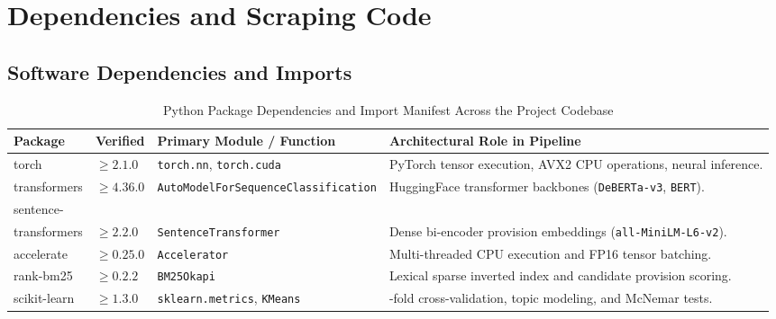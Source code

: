 \chapter{Dependencies and Scraping Code}
\label{app:code_ingestion}

\section{Software Dependencies and Imports}
\label{sec:app_package_manifest}

\begin{table}[htbp]
    \centering
    \scriptsize
    \setlength{\tabcolsep}{3.5pt}
    \renewcommand{\arraystretch}{0.90}
    \caption[Python Package Dependencies and Import Manifest]{Python Package Dependencies and Import Manifest Across the Project Codebase}
    \label{tab:app_package_manifest}
    \begin{tabularx}{\linewidth}{>{\RaggedRight\arraybackslash\ttfamily}p{2.8cm}>{\centering\arraybackslash}p{1.4cm}>{\RaggedRight\arraybackslash}p{3.8cm}>{\RaggedRight\arraybackslash}X}
        \toprule
        \textbf{Package} & \textbf{Verified} & \textbf{Primary Module / Function} & \textbf{Architectural Role in Pipeline} \\
        \midrule
        torch & $\ge 2.1.0$ & \texttt{torch.nn}, \texttt{torch.cuda} & PyTorch tensor execution, AVX2 CPU operations, neural inference. \\
        transformers & $\ge 4.36.0$ & \texttt{AutoModelFor}\allowbreak\texttt{SequenceClassification} & HuggingFace transformer backbones (\texttt{DeBERTa-v3}, \texttt{BERT}). \\
        sentence-\\transformers & $\ge 2.2.0$ & \texttt{SentenceTransformer} & Dense bi-encoder provision embeddings (\texttt{all-MiniLM-L6-v2}). \\
        accelerate & $\ge 0.25.0$ & \texttt{Accelerator} & Multi-threaded CPU execution and FP16 tensor batching. \\
        rank-bm25 & $\ge 0.2.2$ & \texttt{BM25Okapi} & Lexical sparse inverted index and candidate provision scoring. \\
        scikit-learn & $\ge 1.3.0$ & \texttt{sklearn.metrics}, \texttt{KMeans} & 5-fold cross-validation, topic modeling, and McNemar tests. \\

\end{tabularx}
\end{table}
